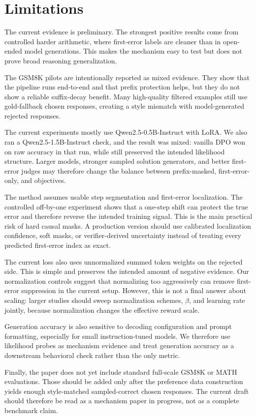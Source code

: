 \section{Limitations}

The current evidence is preliminary. The strongest positive results come from controlled harder arithmetic, where first-error labels are cleaner than in open-ended model generations. This makes the mechanism easy to test but does not prove broad reasoning generalization.

The GSM8K pilots are intentionally reported as mixed evidence. They show that the pipeline runs end-to-end and that prefix protection helps, but they do not show a reliable suffix-decay benefit. Many high-quality filtered examples still use gold-fallback chosen responses, creating a style mismatch with model-generated rejected responses.

The current experiments mostly use Qwen2.5-0.5B-Instruct with LoRA. We also ran a Qwen2.5-1.5B-Instruct check, and the result was mixed: vanilla DPO won on raw accuracy in that run, while \cmdpo{} still preserved the intended likelihood structure. Larger models, stronger sampled solution generators, and better first-error judges may therefore change the balance between prefix-masked, first-error-only, and \cmdpo{} objectives.

The method assumes usable step segmentation and first-error localization. The controlled off-by-one experiment shows that a one-step shift can protect the true error and therefore reverse the intended training signal. This is the main practical risk of hard causal masks. A production version should use calibrated localization confidence, soft masks, or verifier-derived uncertainty instead of treating every predicted first-error index as exact.

The current loss also uses unnormalized summed token weights on the rejected side. This is simple and preserves the intended amount of negative evidence. Our normalization controls suggest that normalizing too aggressively can remove first-error suppression in the current setup. However, this is not a final answer about scaling: larger studies should sweep normalization schemes, $\beta$, and learning rate jointly, because normalization changes the effective reward scale.

Generation accuracy is also sensitive to decoding configuration and prompt formatting, especially for small instruction-tuned models. We therefore use likelihood probes as mechanism evidence and treat generation accuracy as a downstream behavioral check rather than the only metric.

Finally, the paper does not yet include standard full-scale GSM8K or MATH evaluations. Those should be added only after the preference data construction yields enough style-matched sampled-correct chosen responses. The current draft should therefore be read as a mechanism paper in progress, not as a complete benchmark claim.
